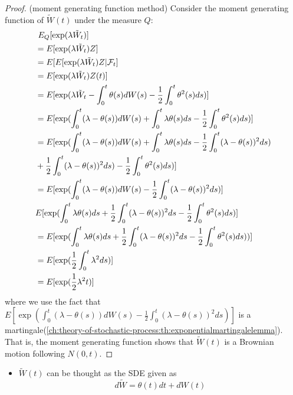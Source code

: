 \begin{refsection}
\begin{proof}
	(moment generating function method)
	Consider the moment generating function of $\tilde{W}(t)$ under the measure $Q$:
	\begin{align*}
	& ~E_Q[\exp(\lambda\tilde{W}_t)] \\
	& = E[\exp(\lambda \tilde{W}_t)Z] \\
	&=E[E[\exp(\lambda\tilde{W}_t)Z|\mathcal{F}_t] \\
	&=E[\exp(\lambda\tilde{W}_t)Z(t)] \\
	&=E[\exp(\lambda\tilde{W}_t  -\int_0^t \theta(s)dW(s) - \frac{1}{2}\int_0^t \theta^2(s)ds)]\\
	&=E[\exp(\int_0^t (\lambda-\theta(s))dW(s) +\int_0^t \lambda\theta(s)ds - \frac{1}{2}\int_0^t \theta^2(s)ds)]\\
	&=E[\exp(\int_0^t (\lambda-\theta(s))dW(s) +\int_0^t \lambda\theta(s)ds - \frac{1}{2}\int_0^t (\lambda-\theta(s))^2ds) \\
	&+ \frac{1}{2}\int_0^t (\lambda-\theta(s))^2ds)- \frac{1}{2}\int_0^t \theta^2(s)ds)]\\
	&=E[\exp(\int_0^t (\lambda-\theta(s))dW(s) - \frac{1}{2}\int_0^t (\lambda-\theta(s))^2ds)]\\
	&E[\exp(\int_0^t \lambda\theta(s)ds+ \frac{1}{2}\int_0^t (\lambda-\theta(s))^2ds- \frac{1}{2}\int_0^t \theta^2(s)ds)] \\
	&=E[\exp(\int_0^t \lambda\theta(s)ds+ \frac{1}{2}\int_0^t (\lambda-\theta(s))^2ds- \frac{1}{2}\int_0^t \theta^2(s)ds))] \\
	&=E[\exp(\frac{1}{2}\int_0^t \lambda^2ds)] \\
	&=E[\exp(\frac{1}{2}\lambda^2t)] 
	\end{align*}
	where we use the fact that $E[\exp(\int_0^t (\lambda-\theta(s))dW(s) - \frac{1}{2}\int_0^t (\lambda-\theta(s))^2ds)]$ is a martingale(\autoref{ch:theory-of-stochastic-process:th:exponentialmartingalelemma}). 
	That is, the moment generating function shows that $\tilde{W}(t)$ is a Brownian motion following $N(0,t)$.
\end{proof}



\begin{remark}\hfill
	\begin{itemize}
		\item $\tilde{W}(t)$ can be thought as the SDE given as
		$$d\tilde{W} = \theta(t)dt + dW(t)$$
	\end{itemize}
\end{remark}


\end{refsection}
